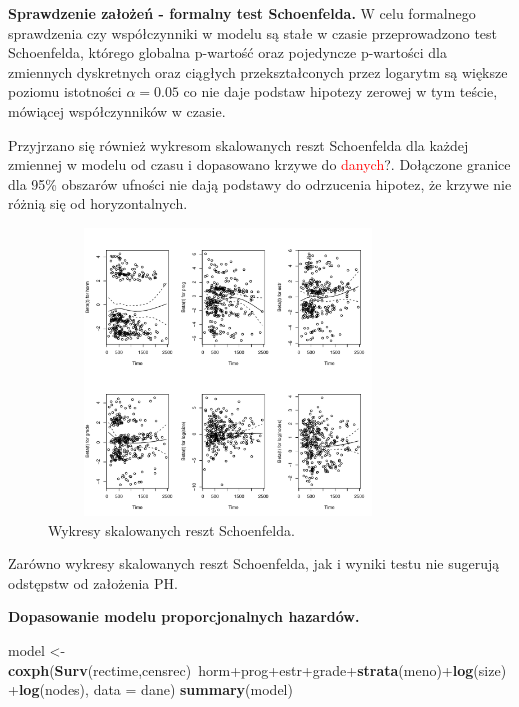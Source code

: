 \documentclass[]{article}
\newenvironment{Shaded}{}{}
\newcommand{\KeywordTok}[1]{\textcolor[rgb]{0.00,0.44,0.13}{\textbf{{#1}}}}
\newcommand{\DataTypeTok}[1]{\textcolor[rgb]{0.56,0.13,0.00}{{#1}}}
\newcommand{\StringTok}[1]{\textcolor[rgb]{0.25,0.44,0.63}{{#1}}}
\newcommand{\NormalTok}[1]{{#1}}
\begin{document}
\textbf{Sprawdzenie założeń - formalny test Schoenfelda.} \newline
W celu formalnego sprawdzenia czy współczynniki w modelu są stałe w
czasie przeprowadzono test Schoenfelda, którego globalna p-wartość oraz
pojedyncze p-wartości dla zmiennych dyskretnych oraz ciągłych
przekształconych przez logarytm są większe  poziomu
istotności $\alpha=0.05$ co nie daje podstaw 
hipotezy zerowej w tym teście, mówiącej  współczynników
w czasie.

Przyjrzano się również wykresom skalowanych reszt Schoenfelda dla każdej
zmiennej w modelu od czasu i dopasowano krzywe do
\textcolor{red}{danych}?. Dołączone granice dla 95\% obszarów ufności
nie dają podstawy do odrzucenia hipotez, że krzywe nie różnią się od
horyzontalnych.

\begin{figure}[hbt!]
\vspace{-10pt}
  \begin{center}
      \includegraphics[width=0.85\textwidth, height=3in]{skal_res_shen.pdf}
      \caption{Wykresy skalowanych reszt Schoenfelda.}
   \end{center}
\end{figure}

Zarówno wykresy skalowanych reszt Schoenfelda, jak i wyniki testu nie
sugerują odstępstw od założenia PH.

\textbf{Dopasowanie modelu proporcjonalnych hazardów.} \newline

\begin{Shaded}
\begin{Highlighting}[]
\NormalTok{model <-}\StringTok{ }\KeywordTok{coxph}\NormalTok{(}\KeywordTok{Surv}\NormalTok{(rectime,censrec)~horm+prog+estr+grade+}\KeywordTok{strata}\NormalTok{(meno)+}\KeywordTok{log}\NormalTok{(size)+}\KeywordTok{log}\NormalTok{(nodes), }
               \DataTypeTok{data =} \NormalTok{dane) }
\KeywordTok{summary}\NormalTok{(model)}
\end{Highlighting}
\end{Shaded}
\end{document}
